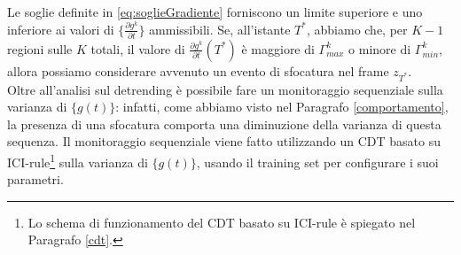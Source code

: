 Le soglie definite in \eqref{eq:soglieGradiente} forniscono un limite superiore e uno inferiore ai valori di $\{\frac{\partial g^k}{\partial t}\}$ ammissibili.
Se, all'istante $T^*$, abbiamo che, per $K-1$ regioni sulle $K$ totali, il valore di $\frac{\partial g^k}{\partial t}(T^*)$ \`e maggiore di $\Gamma_{max}^k$ o minore di $\Gamma_{min}^k$, allora possiamo considerare avvenuto un evento di sfocatura nel frame $z_{T^*}$. \\  
Oltre all'analisi sul detrending \`e possibile fare un monitoraggio sequenziale sulla varianza di $\{g(t)\}$: infatti, come abbiamo visto nel Paragrafo \ref{comportamento}, la presenza di una sfocatura comporta una diminuzione della varianza di questa sequenza.
Il monitoraggio sequenziale viene fatto utilizzando un CDT basato su ICI-rule\footnote{Lo schema di funzionamento del CDT basato su ICI-rule \`e spiegato nel Paragrafo \ref{cdt}.} sulla varianza di $\{g(t)\}$, usando il training set per configurare i suoi parametri.


